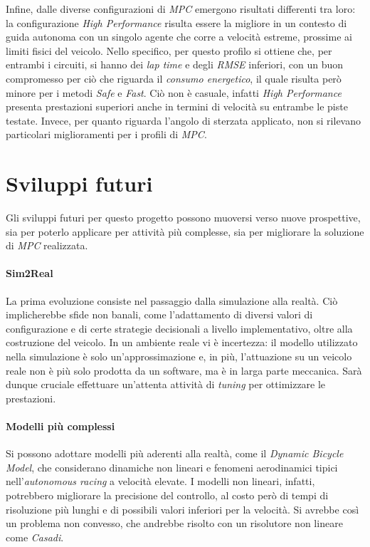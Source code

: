 Infine, dalle diverse configurazioni di \textit{MPC} emergono risultati differenti tra loro:
la configurazione \textit{High Performance} risulta essere la migliore in un contesto di
guida autonoma con un singolo agente che corre a velocità estreme, prossime ai limiti fisici del 
veicolo. Nello specifico, per questo profilo si ottiene che, per entrambi i circuiti, si
hanno dei \textit{lap time} e degli \textit{RMSE} inferiori, con un buon compromesso per
ciò che riguarda il \textit{consumo energetico}, il quale risulta però minore per i metodi 
\textit{Safe} e \textit{Fast}. Ciò non è casuale, infatti \textit{High Performance} presenta 
prestazioni superiori anche in termini di velocità su entrambe le piste testate. Invece, per 
quanto riguarda l'angolo di sterzata applicato, non si rilevano particolari miglioramenti per i profili di \textit{MPC}.

\section{Sviluppi futuri}
Gli sviluppi futuri per questo progetto possono muoversi verso nuove prospettive,
sia per poterlo applicare per attività più complesse, sia per migliorare la soluzione
di \textit{MPC} realizzata.

\paragraph{Sim2Real} La prima evoluzione consiste nel passaggio dalla simulazione alla realtà. 
Ciò implicherebbe sfide non banali, come l'adattamento di diversi valori di configurazione e di 
certe strategie decisionali a livello implementativo, oltre alla costruzione del veicolo.
In un ambiente reale vi è incertezza: il modello utilizzato nella simulazione è solo 
un'approssimazione e, in più, l'attuazione su un veicolo reale non è più solo prodotta da un software, ma è in larga parte meccanica.
Sarà dunque cruciale effettuare un'attenta attività di \textit{tuning} per ottimizzare le prestazioni.
\paragraph{Modelli più complessi} Si possono adottare modelli più aderenti alla realtà, 
come il \textit{Dynamic Bicycle Model}, che considerano dinamiche non lineari e fenomeni
aerodinamici tipici nell'\textit{autonomous racing} a velocità elevate. 
I modelli non lineari, infatti, potrebbero migliorare la precisione del controllo, al costo 
però di tempi di risoluzione più lunghi e di possibili valori inferiori per la velocità.
Si avrebbe così un problema non convesso, che andrebbe risolto con un risolutore non lineare come \textit{Casadi}.
